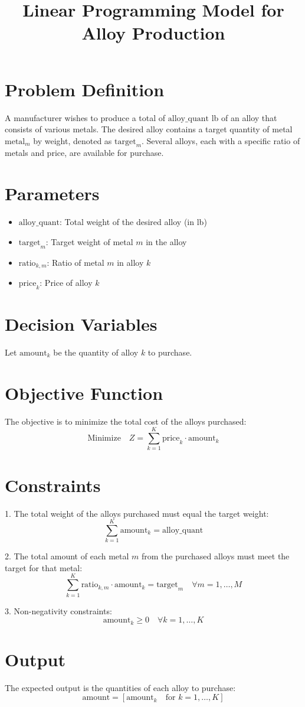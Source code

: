 \documentclass{article}
\begin{document}
\title{Linear Programming Model for Alloy Production}
\author{}
\date{}
\maketitle

\section*{Problem Definition}
A manufacturer wishes to produce a total of \( \text{alloy\_quant} \) lb of an alloy that consists of various metals. The desired alloy contains a target quantity of metal \( \text{metal}_m \) by weight, denoted as \( \text{target}_{m} \). Several alloys, each with a specific ratio of metals and price, are available for purchase.

\section*{Parameters}
\begin{itemize}
    \item \( \text{alloy\_quant} \): Total weight of the desired alloy (in lb)
    \item \( \text{target}_{m} \): Target weight of metal \( m \) in the alloy
    \item \( \text{ratio}_{k, m} \): Ratio of metal \( m \) in alloy \( k \)
    \item \( \text{price}_{k} \): Price of alloy \( k \)
\end{itemize}

\section*{Decision Variables}
Let \( \text{amount}_{k} \) be the quantity of alloy \( k \) to purchase.

\section*{Objective Function}
The objective is to minimize the total cost of the alloys purchased:
\[
\text{Minimize} \quad Z = \sum_{k=1}^{K} \text{price}_{k} \cdot \text{amount}_{k}
\]

\section*{Constraints}
1. The total weight of the alloys purchased must equal the target weight:
\[
\sum_{k=1}^{K} \text{amount}_{k} = \text{alloy\_quant}
\]

2. The total amount of each metal \( m \) from the purchased alloys must meet the target for that metal:
\[
\sum_{k=1}^{K} \text{ratio}_{k, m} \cdot \text{amount}_{k} = \text{target}_{m} \quad \forall m = 1, \ldots, M
\]

3. Non-negativity constraints:
\[
\text{amount}_{k} \geq 0 \quad \forall k = 1, \ldots, K
\]

\section*{Output}
The expected output is the quantities of each alloy to purchase:
\[
\text{amount} = [\text{amount}_{k} \quad \text{for } k = 1, \ldots, K]
\]
\end{document}
